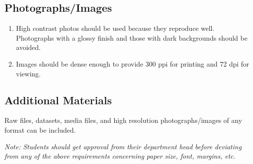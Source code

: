\subsection{Photographs/Images}

\begin{enumerate}
  \item High contrast photos should be used because they reproduce well. Photographs with a glossy finish and those with dark backgrounds should be avoided.
  \item Images should be dense enough to provide 300 ppi for printing and 72 dpi for viewing.
\end{enumerate}

\subsection{Additional Materials}

Raw files, datasets, media files, and high resolution photographs/images of any format can be included.

\emph{Note: Students should get approval from their department head before deviating from any of the above requirements concerning paper size, font, margins, etc. }
